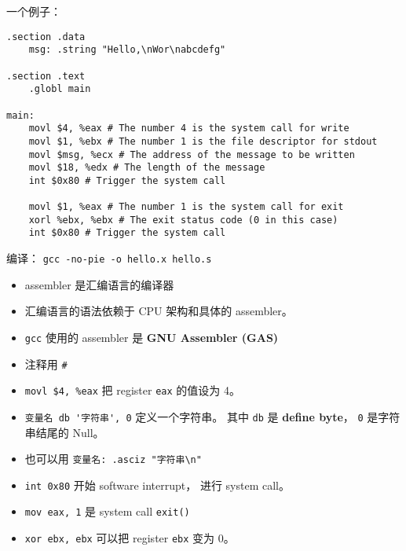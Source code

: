 
\begin{issues}
\issueDraft
\end{issues}

一个例子：
\begin{lstlisting}[language=none]
.section .data
    msg: .string "Hello,\nWor\nabcdefg"

.section .text
    .globl main

main:
    movl $4, %eax # The number 4 is the system call for write
    movl $1, %ebx # The number 1 is the file descriptor for stdout
    movl $msg, %ecx # The address of the message to be written
    movl $18, %edx # The length of the message
    int $0x80 # Trigger the system call

    movl $1, %eax # The number 1 is the system call for exit
    xorl %ebx, %ebx # The exit status code (0 in this case)
    int $0x80 # Trigger the system call
\end{lstlisting}

编译： \verb|gcc -no-pie -o hello.x hello.s|

\begin{itemize}
\item assembler 是汇编语言的编译器
\item 汇编语言的语法依赖于 CPU 架构和具体的 assembler。
\item \verb|gcc| 使用的 assembler 是 \textbf{GNU Assembler (GAS)}
\item 注释用 \verb|#|
\item \verb|movl $4, %eax| 把 register \verb|eax| 的值设为 4。
\item \verb|变量名 db '字符串', 0| 定义一个字符串。 其中 \verb|db| 是 \textbf{define byte}， \verb|0| 是字符串结尾的 Null。
\item 也可以用 \verb|变量名: .asciz "字符串\n"|
\item \verb|int 0x80| 开始 software interrupt， 进行 system call。
\item \verb|mov eax, 1| 是 system call \verb|exit()|
\item \verb|xor ebx, ebx| 可以把 register \verb|ebx| 变为 0。
\end{itemize}
